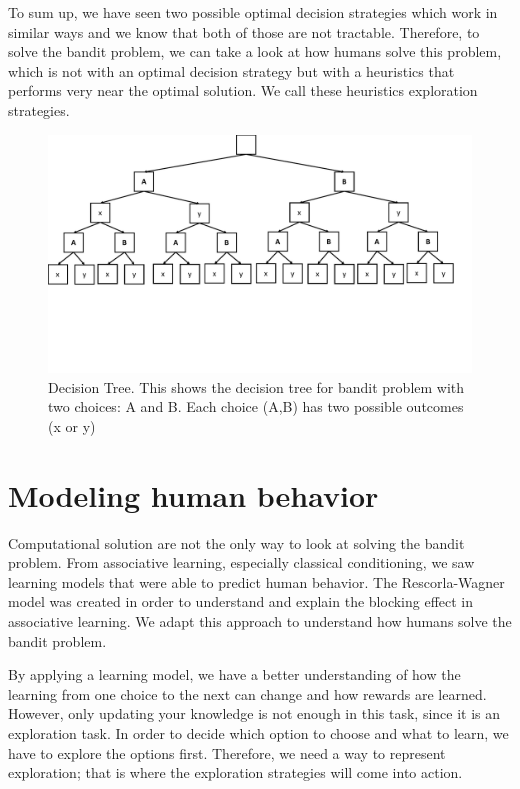 To sum up, we have seen two possible optimal decision strategies which work in similar ways and we know that both of those are not tractable. Therefore, to solve the bandit problem, we can take a look at how humans solve this problem, which is not with an optimal decision strategy but with a heuristics that performs very near the optimal solution. We call these heuristics exploration strategies. 
\begin{figure}
    \centering
    \includegraphics[width=1\textwidth]{Plots/DecisionTree.pdf}
    \vspace{-3.5cm}
    \caption[Decision Tree for Optimal Solution Strategies]{Decision Tree. This shows the decision tree for bandit problem with two choices: A and B. Each choice (A,B) has two possible outcomes (x or y) }
    \label{fig:DecisionTree}
\end{figure}

\section{Modeling human behavior} 
Computational solution are not the only way to look at solving the bandit problem. From associative learning, especially classical conditioning, we saw learning models that were able to predict human behavior. The Rescorla-Wagner model was created in order to understand and explain the blocking effect in associative learning. We adapt this approach to understand how humans solve the bandit problem.

By applying a learning model, we have a better understanding of how the learning from one choice to the next can change and how rewards are learned. However, only updating your knowledge is not enough in this task, since it is an exploration task. In order to decide which option to choose and what to learn, we have to explore the options first. Therefore, we need a way to represent exploration; that is where the exploration strategies will come into action. 

